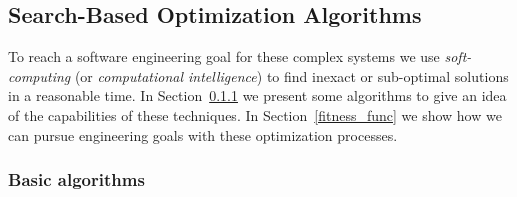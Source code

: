 \documentclass[11pt]{sdm}
\begin{document}
\subsection{Search-Based Optimization Algorithms}
\label{example_algo}
To reach a software engineering goal for these complex systems we use \textit{soft-computing} (or \textit{computational intelligence}) to find inexact or sub-optimal solutions in a reasonable time.
In Section~\ref{basic_algo} we present some algorithms to give an idea of the capabilities of these techniques.
In Section~\ref{fitness_func} we show how we can pursue engineering goals with these optimization processes.

\subsubsection{Basic algorithms}
\label{basic_algo}
\end{document}
